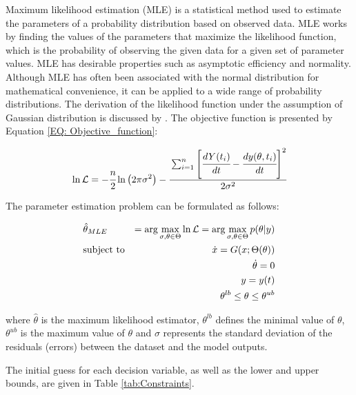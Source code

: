 \documentclass[a4paper,fleqn]{cas-dc}
\begin{document}
Maximum likelihood estimation (MLE) is a statistical method used to estimate the parameters of a probability distribution based on observed data. MLE works by finding the values of the parameters that maximize the likelihood function, which is the probability of observing the given data for a given set of parameter values. MLE has desirable properties such as asymptotic efficiency and normality. Although MLE has often been associated with the normal distribution for mathematical convenience, it can be applied to a wide range of probability distributions. The derivation of the likelihood function under the assumption of  Gaussian distribution is discussed by \citet{Himmelblau1970}. The objective function is presented by Equation \ref{EQ: Objective_function}:

{\footnotesize
	\begin{equation} \label{EQ: Objective_function}
		\ln \mathcal{L} = -\cfrac{n}{2}  \ln \left(2 \pi \sigma^2\right) 
		- \cfrac{ \sum_{i=1}^{n} \left[  \cfrac{d {Y}(t_i)}{dt} - \cfrac{dy(\theta, t_i)}{dt} \right]^2 }{2 \sigma^2}
	\end{equation}
}

The parameter estimation problem can be formulated as follows:

{\footnotesize
	\begin{equation}
		\begin{aligned} \label{EQ: Optimization_formulation_MLE}
			&\hat{\theta}_{MLE} &= \arg \max_{\sigma, \theta \in \Theta} \ln \mathcal{L} = \arg \max_{\sigma,\theta \in \Theta} p(\theta|y) \\
			&\text{subject to}
			& \dot{ x } = G({\color{black} x};\Theta(\theta)) \\
			&& \dot{\theta} = 0 \\
			&& y = y(t) \\
			&& \theta^{lb} \leq \theta \leq \theta^{ub}
		\end{aligned}
\end{equation} } 

where $\hat{\theta}$ is the maximum likelihood estimator, $\theta^{lb}$ defines the minimal value of $\theta$, $\theta^{ub}$ is the maximum value of $\theta$ and $\sigma$ represents the standard deviation of the residuals (errors) between the dataset and the model outputs.

The initial guess for each decision variable, as well as the lower and upper bounds, are given in Table \ref{tab:Constraints}. 
\end{document}
